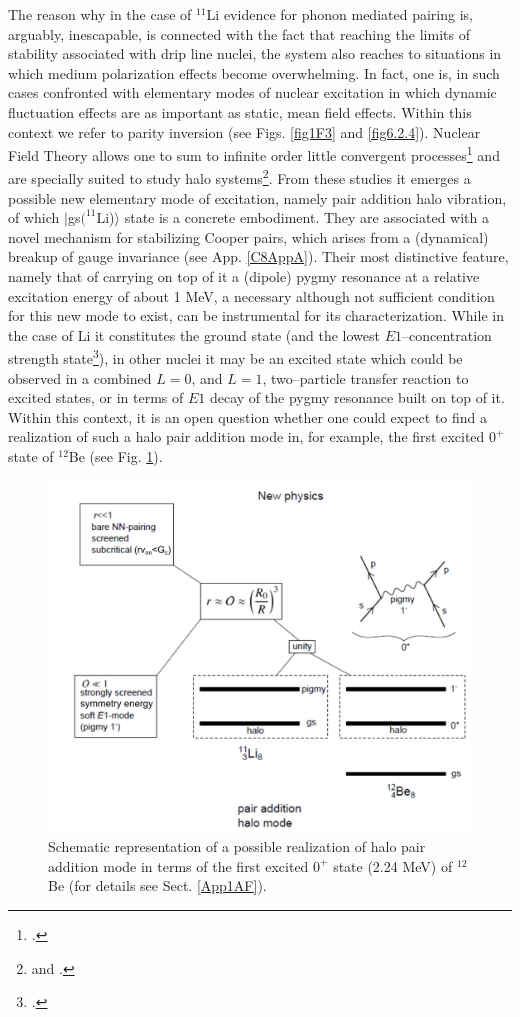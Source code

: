  The reason why in the case of $^{11}$Li evidence for phonon mediated pairing is, arguably, inescapable, is connected with the fact that reaching the limits of stability associated with drip line nuclei, the system also reaches to situations in which medium polarization effects become overwhelming. In fact, one is, in such cases confronted with elementary modes of nuclear excitation in which dynamic fluctuation effects are as important as static, mean field effects. Within this context we refer to  parity inversion (see Figs. \ref{fig1F3}  and \ref{fig6.2.4}). Nuclear Field Theory  allows one to sum to infinite order little convergent processes\footnote{\cite{Bortignon:78}.} and are specially suited to study halo systems\footnote{\citet{Barranco:01} and \citet{Gori:04}.}. From these studies it emerges a possible new elementary mode of excitation, namely pair addition halo vibration, of which $|$gs$(^{11}$Li)$\rangle$ state is a concrete embodiment. They are associated with a novel mechanism  for stabilizing Cooper pairs, which arises from a (dynamical) breakup of gauge invariance (see App. \ref{C8AppA}). Their most distinctive feature, namely that of carrying on top of it a (dipole) pygmy resonance at a relative excitation energy of about 1 MeV, a necessary although not sufficient condition for this new mode to exist, can be instrumental for its characterization. While in the case of Li it constitutes the ground state (and the lowest $E1$--concentration strength state\footnote{\cite{Kanungo:15}.}), in other nuclei  it may be an excited state which could  be  observed in a combined $L=0$, and $L=1$, two--particle transfer reaction to excited states, or in terms of $E1$ decay of the pygmy resonance built on top of it. Within this context, it is an open question whether one could expect to find  a realization of such a halo pair addition mode in, for example, the first excited $0^+$ state of $^{12}$Be (see Fig. \ref{fig8_2_4x}).
   \begin{figure}
   \centerline{\includegraphics*[width=12cm,angle=0]{C8/figsC8/pigmy}}
   	\caption{Schematic representation of a possible realization of halo pair addition mode in terms of the first excited $0^+$ state (2.24 MeV) of $^{12}$Be (for details see Sect. \ref{App1AF}).}\label{fig8_2_4x}
   \end{figure}
   

